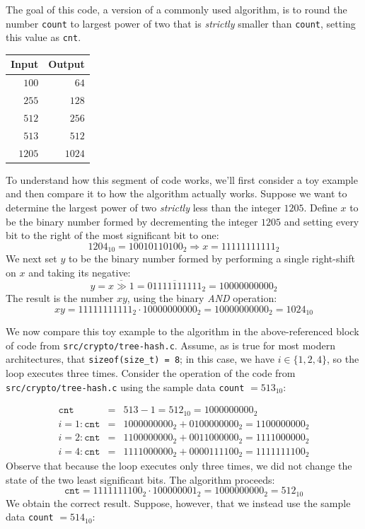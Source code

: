 \documentclass{mrl}
\begin{document}
The goal of this code, a version of a commonly used algorithm, is to round the number \texttt{count} to largest power of two that is \emph{strictly} smaller than \texttt{count}, setting this value as \texttt{cnt}\cite{viega2003secure}. 
\begin{center}
\begin{tabular}{r|r}
Input & Output \\
\hline
$100$ & $64$ \\
$255$ & $128$ \\
$512$ & $256$ \\
$513$ & $512$ \\
$1205$ & $1024$
\end{tabular}
\end{center}
To understand how this segment of code works, we'll first consider a toy example and then compare it to how the algorithm actually works. Suppose we want to determine the largest power of two \emph{strictly} less than the integer $1205$. Define $x$ to be the binary number formed by decrementing the integer $1205$ and setting every bit to the right of the most significant bit to one:
$$1204_{10} = 10010110100_2 \Rightarrow x = 11111111111_2$$
We next set $y$ to be the binary number formed by performing a single right-shift on $x$ and taking its negative:
$$y = \overline{x \gg 1} = \overline{01111111111}_2 = 10000000000_2$$
The result is the number $xy$, using the binary {\it AND} operation:
$$xy = 11111111111_2 \cdot 10000000000_2 = 10000000000_2 = 1024_{10}$$

We now compare this toy example to the algorithm in the above-referenced block of code from \texttt{src/crypto/tree-hash.c}. Assume, as is true for most modern architectures, that \texttt{sizeof(size\_t) = 8}; in this case, we have $i \in \{1,2,4\}$, so the loop executes three times. Consider the operation of the code from \texttt{src/crypto/tree-hash.c} using the sample data \texttt{count} $=513_{10}$:

\begin{eqnarray*}
\texttt{cnt}&=&513-1=512_{10}=1000000000_2 \\
i=1: \texttt{cnt} &=&1000000000_{2}+0100000000_{2}=1100000000_{2} \\
i=2: \texttt{cnt} &=&1100000000_{2}+0011000000_{2}=1111000000_{2} \\
i=4: \texttt{cnt} &=&1111000000_{2}+0000111100_{2}=1111111100_{2}
\end{eqnarray*}
Observe that because the loop executes only three times, we did not change the state of the two least significant bits. The algorithm proceeds:
$$\texttt{cnt} =1111111100_{2} \cdot 100000001_{2}=1000000000_{2}=512_{10}$$
We obtain the correct result. Suppose, however, that we instead use the sample data \texttt{count} $=514_{10}$:
\end{document}
